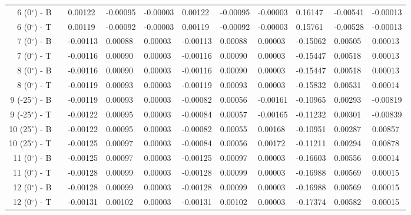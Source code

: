 \begin{table}[H]
\begin{longtable}{@{}rllllllllll@{}}
   6 (0$^\circ$) - B &&       0.00122 &      -0.00095 &      -0.00003 &       0.00122 &      -0.00095 &      -0.00003 &     0.16147 &    -0.00541 &    -0.00013 \\
   6 (0$^\circ$) - T &&       0.00119 &      -0.00092 &      -0.00003 &       0.00119 &      -0.00092 &      -0.00003 &     0.15761 &    -0.00528 &    -0.00013 \\\midrule\midrule
   7 (0$^\circ$) - B &&      -0.00113 &       0.00088 &       0.00003 &      -0.00113 &       0.00088 &       0.00003 &    -0.15062 &     0.00505 &     0.00013 \\
   7 (0$^\circ$) - T &&      -0.00116 &       0.00090 &       0.00003 &      -0.00116 &       0.00090 &       0.00003 &    -0.15447 &     0.00518 &     0.00013 \\\midrule
   8 (0$^\circ$) - B &&      -0.00116 &       0.00090 &       0.00003 &      -0.00116 &       0.00090 &       0.00003 &    -0.15447 &     0.00518 &     0.00013 \\
   8 (0$^\circ$) - T &&      -0.00119 &       0.00093 &       0.00003 &      -0.00119 &       0.00093 &       0.00003 &    -0.15832 &     0.00531 &     0.00014 \\\midrule
 9 (-25$^\circ$) - B &&      -0.00119 &       0.00093 &       0.00003 &      -0.00082 &       0.00056 &      -0.00161 &    -0.10965 &     0.00293 &    -0.00819 \\
 9 (-25$^\circ$) - T &&      -0.00122 &       0.00095 &       0.00003 &      -0.00084 &       0.00057 &      -0.00165 &    -0.11232 &     0.00301 &    -0.00839 \\\midrule
 10 (25$^\circ$) - B &&      -0.00122 &       0.00095 &       0.00003 &      -0.00082 &       0.00055 &       0.00168 &    -0.10951 &     0.00287 &     0.00857 \\
 10 (25$^\circ$) - T &&      -0.00125 &       0.00097 &       0.00003 &      -0.00084 &       0.00056 &       0.00172 &    -0.11211 &     0.00294 &     0.00878 \\\midrule
  11 (0$^\circ$) - B &&      -0.00125 &       0.00097 &       0.00003 &      -0.00125 &       0.00097 &       0.00003 &    -0.16603 &     0.00556 &     0.00014 \\
  11 (0$^\circ$) - T &&      -0.00128 &       0.00099 &       0.00003 &      -0.00128 &       0.00099 &       0.00003 &    -0.16988 &     0.00569 &     0.00015 \\\midrule
  12 (0$^\circ$) - B &&      -0.00128 &       0.00099 &       0.00003 &      -0.00128 &       0.00099 &       0.00003 &    -0.16988 &     0.00569 &     0.00015 \\
  12 (0$^\circ$) - T &&      -0.00131 &       0.00102 &       0.00003 &      -0.00131 &       0.00102 &       0.00003 &    -0.17374 &     0.00582 &     0.00015 \\\bottomrule
\end{longtable}
\end{table}